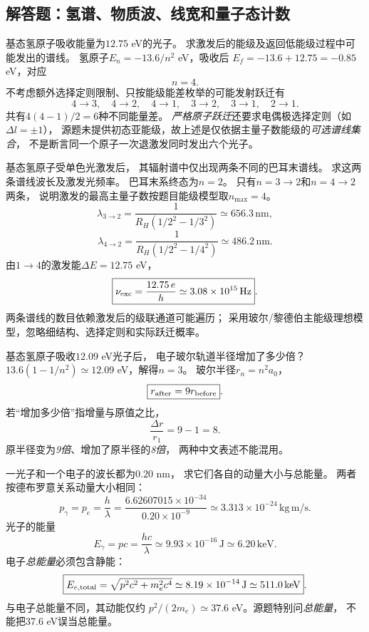 \subsection{解答题：氢谱、物质波、线宽和量子态计数}

\problemtext 基态氢原子吸收能量为$12.75$ eV的光子。
求激发后的能级及返回低能级过程中可能发出的谱线。
\workings
氢原子$E_n=-13.6/n^2$ eV，吸收后
$E_f=-13.6+12.75=-0.85$ eV，对应
\[
\boxed{n=4}.
\]
不考虑额外选择定则限制、只按能级能差枚举的可能发射跃迁有
\[
\boxed{4\to3,\quad4\to2,\quad4\to1,\quad
3\to2,\quad3\to1,\quad2\to1}.
\]
共有$4(4-1)/2=6$种不同能量差。
\crosscheck \emph{严格原子跃迁}还要求电偶极选择定则（如$\Delta l=\pm1$），
源题未提供初态亚能级，故上述是仅依据主量子数能级的\emph{可选谱线集合}，
不是断言同一个原子一次退激发同时发出六个光子。

\problemtext 基态氢原子受单色光激发后，
其辐射谱中仅出现两条不同的巴耳末谱线。
求这两条谱线波长及激发光频率。
\workings
巴耳末系终态为$n=2$。
只有$n=3\to2$和$n=4\to2$两条，
说明激发的最高主量子数按题目能级模型取$n_{\max}=4$。
\[
\boxed{\lambda_{3\to2}
=\frac1{R_H(1/2^2-1/3^2)}
\simeq656.3\,\mathrm{nm}},
\]
\[
\boxed{\lambda_{4\to2}
=\frac1{R_H(1/2^2-1/4^2)}
\simeq486.2\,\mathrm{nm}}.
\]
由$1\to4$的激发能$\Delta E=12.75$ eV，
\[
\boxed{\nu_{\rm exc}=\frac{12.75\,e}{h}
\simeq3.08\times10^{15}\,\mathrm{Hz}}.
\]
\crosscheck 两条谱线的数目依赖激发后的级联通道可能遍历；
采用玻尔/黎德伯主能级理想模型，忽略细结构、选择定则和实际跃迁概率。

\problemtext 基态氢原子吸收$12.09$ eV光子后，
电子玻尔轨道半径增加了多少倍？
\workings
$13.6(1-1/n^2)\simeq12.09$ eV，解得$n=3$。
玻尔半径$r_n=n^2a_0$，
\[
\boxed{r_{\rm after}=9r_{\rm before}}.
\]
若“增加多少倍”指增量与原值之比，
\[
\boxed{\frac{\Delta r}{r_1}=9-1=8}.
\]
\crosscheck 原半径变为\emph{9倍}、增加了原半径的\emph{8倍}，
两种中文表述不能混用。

\problemtext 一光子和一个电子的波长都为$0.20$ nm，
求它们各自的动量大小与总能量。
\workings
两者按德布罗意关系动量大小相同：
\[
\boxed{p_\gamma=p_e=\frac{h}{\lambda}
=\frac{6.62607015\times10^{-34}}{0.20\times10^{-9}}
\simeq3.313\times10^{-24}\,\mathrm{kg\,m/s}}.
\]
光子的能量
\[
\boxed{E_\gamma=pc=\frac{hc}{\lambda}
\simeq9.93\times10^{-16}\,\mathrm J
\simeq6.20\,\mathrm{keV}}.
\]
电子\emph{总能量}必须包含静能：
\[
\boxed{E_{e,\rm total}=\sqrt{p^2c^2+m_e^2c^4}
\simeq8.19\times10^{-14}\,\mathrm J
\simeq511.0\,\mathrm{keV}}.
\]
\crosscheck 与电子总能量不同，其动能仅约
$p^2/(2m_e)\simeq37.6$ eV。源题特别问\emph{总能量}，
不能把37.6 eV误当总能量。

